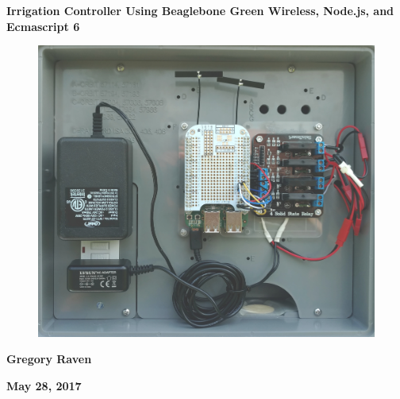 \thispagestyle{empty}
{\centering\bfseries\color{black}\Huge
Irrigation Controller Using Beaglebone Green Wireless, Node.js, and Ecmascript 6
\par}

\bigskip

\begin{figure}
	\centering
	\includegraphics[width=\textwidth]{photos/cover_photo}
\end{figure}

\bigskip
{\centering\bfseries\Large
Gregory Raven
\par}


\bigskip
{\centering\bfseries\LARGE
May 28, 2017
\par}



